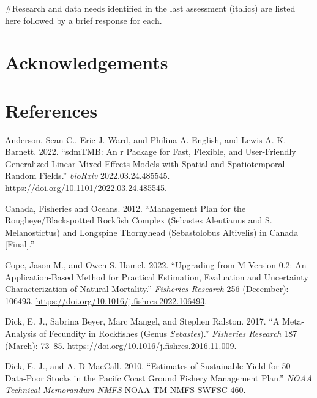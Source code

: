 \documentclass[
]{scrartcl}
\newlength{\cslhangindent}
\newenvironment{CSLReferences}[2] %
 {\begin{list}{}{%
  \setlength{\itemindent}{0pt}
  \setlength{\leftmargin}{0pt}
  \setlength{\parsep}{0pt}
  \ifodd #1
   \setlength{\leftmargin}{\cslhangindent}
   \setlength{\itemindent}{-1\cslhangindent}
  \fi
  \setlength{\itemsep}{#2\baselineskip}}}
 {\end{list}}
\begin{document}
\#Research and data needs identified in the last assessment (italics)
are listed here followed by a brief response for each.

\newpage{}

\section{Acknowledgements}\label{sec-acknowledgements}

\newpage{}

\section{References}\label{references}

\label{refs}
\begin{CSLReferences}{1}{0}
Anderson, Sean C., Eric J. Ward, and Philina A. English, and Lewis A. K.
Barnett. 2022. {``{sdmTMB}: An r Package for Fast, Flexible, and
User-Friendly Generalized Linear Mixed Effects Models with Spatial and
Spatiotemporal Random Fields.''} \emph{bioRxiv} 2022.03.24.485545.
\url{https://doi.org/10.1101/2022.03.24.485545}.

Canada, Fisheries and Oceans. 2012. {``Management {Plan} for the
{Rougheye}/{Blackspotted} {Rockfish} {Complex} ({Sebastes} Aleutianus
and {S}. Melanostictus) and {Longspine} {Thornyhead} ({Sebastolobus}
Altivelis) in {Canada} {[}{Final}{]}.''}

Cope, Jason M., and Owen S. Hamel. 2022. {``Upgrading from {M} Version
0.2: {An} Application-Based Method for Practical Estimation, Evaluation
and Uncertainty Characterization of Natural Mortality.''}
\emph{Fisheries Research} 256 (December): 106493.
\url{https://doi.org/10.1016/j.fishres.2022.106493}.

Dick, E. J., Sabrina Beyer, Marc Mangel, and Stephen Ralston. 2017. {``A
Meta-Analysis of Fecundity in Rockfishes (Genus \emph{Sebastes}).''}
\emph{Fisheries Research} 187 (March): 73--85.
\url{https://doi.org/10.1016/j.fishres.2016.11.009}.

Dick, E. J., and A. D MacCall. 2010. {``Estimates of Sustainable Yield
for 50 Data-Poor Stocks in the {Pacifc} Coast Ground {Fishery}
{Management} {Plan}.''} \emph{NOAA Technical Memorandum NMFS}
NOAA-TM-NMFS-SWFSC-460.


\end{CSLReferences}
\end{document}
